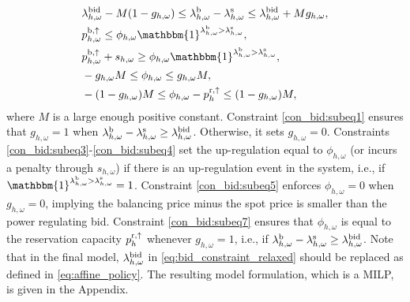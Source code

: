 \documentclass[11pt,a4paper]{article}
\begin{document}
\begin{subequations}\label{eq:bid_constraint_relaxed}
    \begin{align}
         & \lambda_{h,\omega}^{\rm{bid}} - M  (1 - g_{h,\omega}) \leq \lambda_{h,\omega}^{\rm{b}} - \lambda_{h,\omega}^{\rm{s}} \leq \lambda_{h,\omega}^{\rm{bid}} + M  g_{h,\omega},                               \label{con_bid:subeq1} \\
         & p^{\rm{b}, \uparrow}_{h,\omega} \leq \phi_{h,\omega}  \mathbbm{1}^{\lambda^{\rm{b}}_{h,\omega} > \lambda^{\rm{s}}_{h,\omega}}, \                          \label{con_bid:subeq3}                                                \\
         & p^{\rm{b}, \uparrow}_{h,\omega} + s_{h,\omega} \geq \phi_{h,\omega}  \mathbbm{1}^{\lambda^{\rm{b}}_{h,\omega} > \lambda^{\rm{s}}_{h,\omega}}, \            \label{con_bid:subeq4}                                               \\
         & -g_{h,\omega}  M \leq \phi_{h,\omega} \leq g_{h,\omega}  M,                                   \label{con_bid:subeq5}                                                                                                            \\
         & -(1 - g_{h,\omega})  M \leq \phi_{h,\omega} - p^{\rm{r},\uparrow}_{h} \leq (1 - g_{h,\omega}) M, \                                                                                    \label{con_bid:subeq7}  \
    \end{align}
\end{subequations}
where $M$ is a large enough positive constant.
Constraint \eqref{con_bid:subeq1} ensures that $g_{h,\omega} = 1$ when $\lambda_{h,\omega}^{\rm{b}} - \lambda_{h,\omega}^{\rm{s}} \geq \lambda^{\rm{bid}}_{h, \omega}$. Otherwise, it sets $g_{h,\omega} = 0$. Constraints \eqref{con_bid:subeq3}-\eqref{con_bid:subeq4} set the up-regulation equal to $\phi_{h,\omega}$ (or incurs a penalty through $s_{h,\omega}$) if there is an up-regulation event in the system, i.e., if $\mathbbm{1}^{\lambda^{\rm{b}}_{h,\omega} > \lambda^{\rm{s}}_{h,\omega}} = 1$. Constraint \eqref{con_bid:subeq5} enforces  $\phi_{h,\omega} = 0$ when $g_{h,\omega} = 0$, implying the balancing price minus the spot price is smaller than the power regulating bid. Constraint \eqref{con_bid:subeq7} ensures that $\phi_{h,\omega}$ is equal to the reservation capacity $p^{\rm{r},\uparrow}_{h}$ whenever $g_{h,\omega} = 1$, i.e., if $\lambda_{h,\omega}^{\rm{b}} - \lambda_{h,\omega}^{\rm{s}} \geq \lambda^{\rm{bid}}_{h, \omega}$. Note that in the final model,  $\lambda^{\rm{bid}}_{h, \omega}$ in \eqref{eq:bid_constraint_relaxed} should be replaced as defined in \eqref{eq:affine_policy}. The resulting model formulation, which is a MILP, is given in the Appendix.
\end{document}
